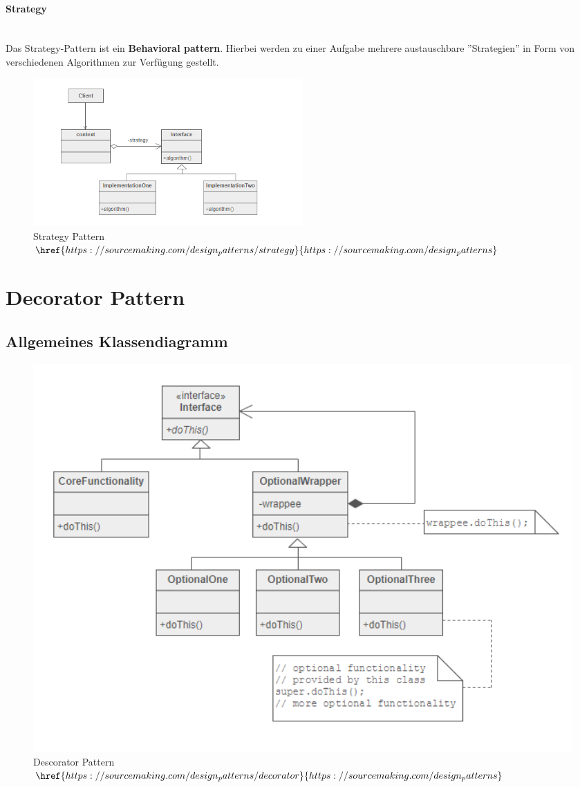 	\paragraph{Strategy}~\\
Das Strategy-Pattern ist ein \textbf{Behavioral pattern}. Hierbei werden zu einer Aufgabe mehrere austauschbare ''Strategien'' in Form von verschiedenen Algorithmen zur Verfügung gestellt. 
\begin{figure}[H]
	\centering
	\includegraphics[width=0.5\textwidth]{images/strategy.png}
	\caption{Strategy Pattern \\ $\href{https://sourcemaking.com/design_patterns/strategy}{https://sourcemaking.com/design_patterns}$}
\end{figure}
\clearpage
\section{Decorator Pattern}
	\subsection{Allgemeines Klassendiagramm}
\begin{figure}[H]
	\centering
	\includegraphics[width=1\textwidth]{images/Decorator.png}
	\caption{ Descorator Pattern \\ $\href{https://sourcemaking.com/design_patterns/decorator}{https://sourcemaking.com/design_patterns}$}
\end{figure}
